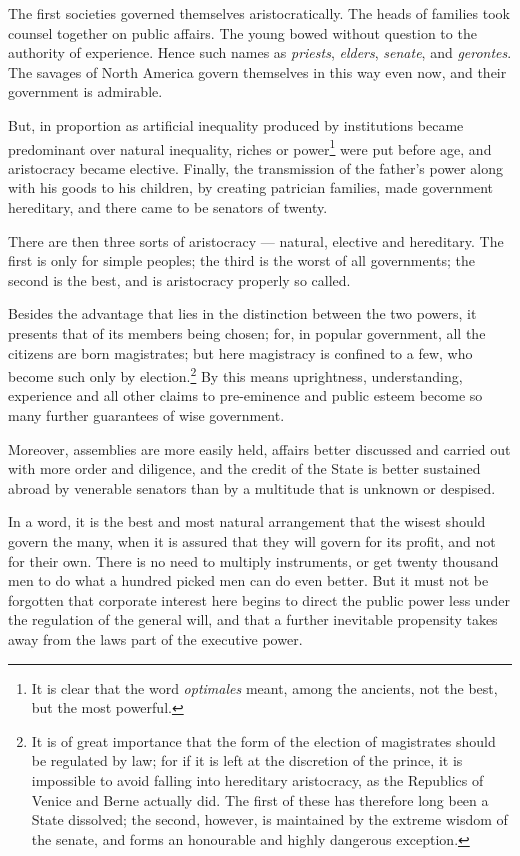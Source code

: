 \documentclass[12pt]{report}
\begin{document}
The first societies governed themselves aristocratically. The heads of families took counsel together on public affairs. The young bowed without question to the authority of experience. Hence such names as \textit{priests}, \textit{elders}, \textit{senate}, and \textit{gerontes}. The savages of North America govern themselves in this way even now, and their government is admirable.

But, in proportion as artificial inequality produced by institutions became predominant over natural inequality, riches or power\footnote{It is clear that the word \textit{optimales} meant, among the ancients, not the best, but the most powerful.} were put before age, and aristocracy became elective. Finally, the transmission of the father's power along with his goods to his children, by creating patrician families, made government hereditary, and there came to be senators of twenty.

There are then three sorts of aristocracy — natural, elective and hereditary. The first is only for simple peoples; the third is the worst of all governments; the second is the best, and is aristocracy properly so called.

Besides the advantage that lies in the distinction between the two powers, it presents that of its members being chosen; for, in popular government, all the citizens are born magistrates; but here magistracy is confined to a few, who become such only by election.\footnote{It is of great importance that the form of the election of magistrates should be regulated by law; for if it is left at the discretion of the prince, it is impossible to avoid falling into hereditary aristocracy, as the Republics of Venice and Berne actually did. The first of these has therefore long been a State dissolved; the second, however, is maintained by the extreme wisdom of the senate, and forms an honourable and highly dangerous exception.} By this means uprightness, understanding, experience and all other claims to pre-eminence and public esteem become so many further guarantees of wise government.

Moreover, assemblies are more easily held, affairs better discussed and carried out with more order and diligence, and the credit of the State is better sustained abroad by venerable senators than by a multitude that is unknown or despised.

In a word, it is the best and most natural arrangement that the wisest should govern the many, when it is assured that they will govern for its profit, and not for their own. There is no need to multiply instruments, or get twenty thousand men to do what a hundred picked men can do even better. But it must not be forgotten that corporate interest here begins to direct the public power less under the regulation of the general will, and that a further inevitable propensity takes away from the laws part of the executive power.
\end{document}
